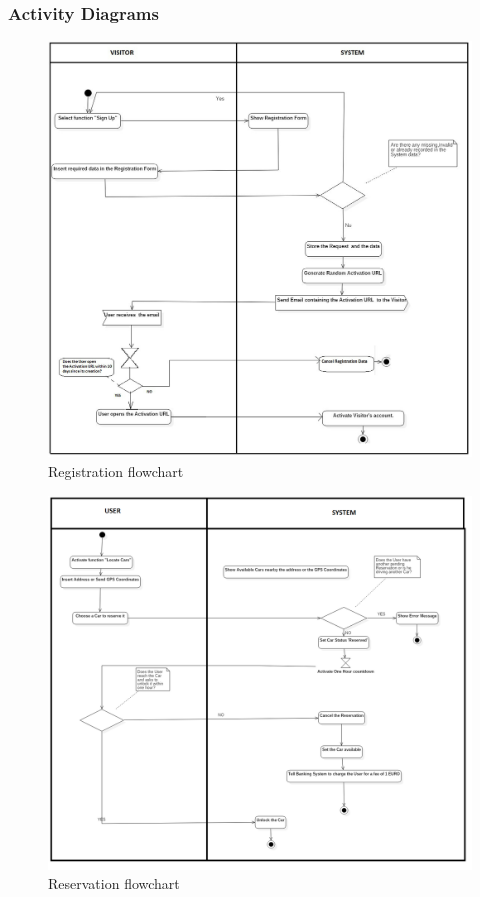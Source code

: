 \subsubsection{Activity Diagrams}
\begin{figure}[h]
\centering
\includegraphics[width=\linewidth,keepaspectratio]{../Diagrams/AD/Registration.jpg}
\caption{Registration flowchart}
\end{figure}
\FloatBarrier
\begin{figure}[h]
\centering
\includegraphics[width=\linewidth,keepaspectratio]{../Diagrams/AD/Locate_Reserve_Unlock.png}
\caption{Reservation flowchart}
\end{figure}
